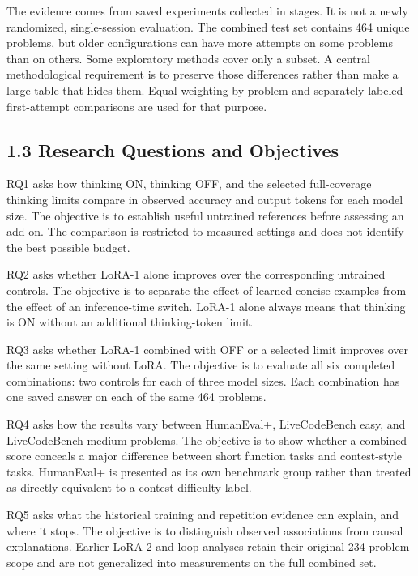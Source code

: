 \documentclass[11pt,letterpaper]{article}
\begin{document}
The evidence comes from saved experiments collected in stages. It is not a newly randomized, single-session evaluation. The combined test set contains 464 unique problems, but older configurations can have more attempts on some problems than on others. Some exploratory methods cover only a subset. A central methodological requirement is to preserve those differences rather than make a large table that hides them. Equal weighting by problem and separately labeled first-attempt comparisons are used for that purpose.\par

\subsection*{1.3 Research Questions and Objectives}

RQ1 asks how thinking ON, thinking OFF, and the selected full-coverage thinking limits compare in observed accuracy and output tokens for each model size. The objective is to establish useful untrained references before assessing an add-on. The comparison is restricted to measured settings and does not identify the best possible budget.\par

RQ2 asks whether LoRA-1 alone improves over the corresponding untrained controls. The objective is to separate the effect of learned concise examples from the effect of an inference-time switch. LoRA-1 alone always means that thinking is ON without an additional thinking-token limit.\par

RQ3 asks whether LoRA-1 combined with OFF or a selected limit improves over the same setting without LoRA. The objective is to evaluate all six completed combinations: two controls for each of three model sizes. Each combination has one saved answer on each of the same 464 problems.\par

RQ4 asks how the results vary between HumanEval+, LiveCodeBench easy, and LiveCodeBench medium problems. The objective is to show whether a combined score conceals a major difference between short function tasks and contest-style tasks. HumanEval+ is presented as its own benchmark group rather than treated as directly equivalent to a contest difficulty label.\par

RQ5 asks what the historical training and repetition evidence can explain, and where it stops. The objective is to distinguish observed associations from causal explanations. Earlier LoRA-2 and loop analyses retain their original 234-problem scope and are not generalized into measurements on the full combined set.\par
\end{document}
